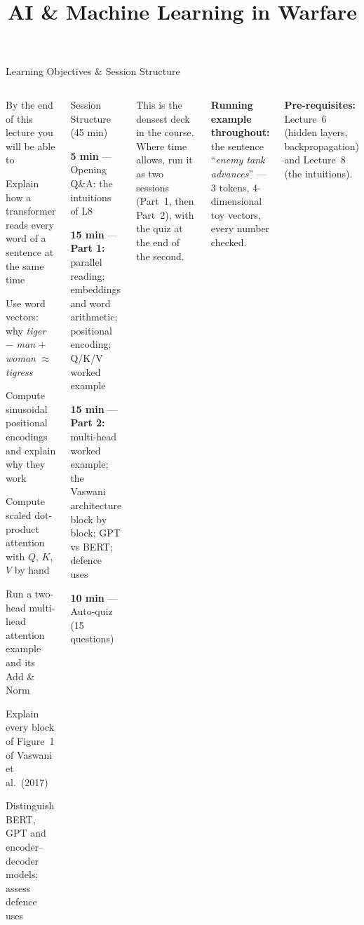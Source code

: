 \documentclass[aspectratio=169,10pt]{beamer}
\title{AI \& Machine Learning in Warfare}
\begin{document}


\begin{frame}{Learning Objectives \& Session Structure}
\begin{columns}[T]
\begin{cbox}{By the end of this lecture you will be able to}
\begin{te}
\item Explain how a transformer reads every word of a sentence at the same time
\item Use word vectors: why \emph{tiger} $-$ \emph{man} $+$ \emph{woman} $\approx$ \emph{tigress}
\item Compute sinusoidal positional encodings and explain why they work
\item Compute scaled dot-product attention with $Q$, $K$, $V$ by hand
\item Run a two-head multi-head attention example and its Add \& Norm
\item Explain every block of Figure~1 of Vaswani et al.\ (2017)
\item Distinguish BERT, GPT and encoder--decoder models; assess defence uses
\end{te}
\end{cbox}
\begin{cbox}[ISSAnavy]{Session Structure (45 min)}
\begin{tl}
\item \textbf{5 min} --- Opening Q\&A: the intuitions of L8
\item \textbf{15 min} --- \textbf{Part 1:} parallel reading; embeddings and word arithmetic; positional encoding; Q/K/V worked example
\item \textbf{15 min} --- \textbf{Part 2:} multi-head worked example; the Vaswani architecture block by block; GPT vs BERT; defence uses
\item \textbf{10 min} --- Auto-quiz (15 questions)
\end{tl}
\end{cbox}
\begin{ibox}\scriptsize This is the densest deck in the course. Where time allows, run it as two sessions (Part~1, then Part~2), with the quiz at the end of the second.\end{ibox}
\begin{ibox}\textbf{Running example throughout:} the sentence ``\emph{enemy tank advances}'' --- 3 tokens, 4-dimensional toy vectors, every number checked.\end{ibox}
\begin{ibox}\textbf{Pre-requisites:} Lecture~6 (hidden layers, backpropagation) and Lecture~8 (the intuitions).\end{ibox}
\end{columns}
\end{frame}
\end{document}
